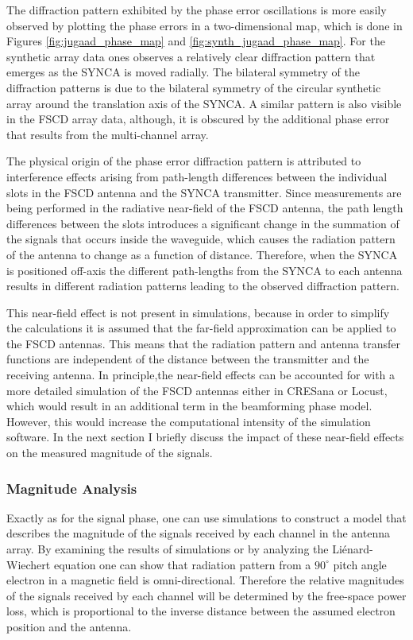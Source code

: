 The diffraction pattern exhibited by the phase error oscillations is more easily observed by plotting the phase errors in a two-dimensional map, which is done in Figures \ref{fig:jugaad_phase_map} and \ref{fig:synth_jugaad_phase_map}. For the synthetic array data ones observes a relatively clear diffraction pattern that emerges as the SYNCA is moved radially. The bilateral symmetry of the diffraction patterns is due to the bilateral symmetry of the circular synthetic array around the translation axis of the SYNCA. A similar pattern is also visible in the FSCD array data, although, it is obscured by the additional phase error that results from the multi-channel array.

The physical origin of the phase error diffraction pattern is attributed to interference effects arising from path-length differences between the individual slots in the FSCD antenna and the SYNCA transmitter. Since measurements are being performed in the radiative near-field of the FSCD antenna, the path length differences between the slots introduces a significant change in the summation of the signals that occurs inside the waveguide, which causes the radiation pattern of the antenna to change as a function of distance. Therefore, when the SYNCA is positioned off-axis the different path-lengths from the SYNCA to each antenna results in different radiation patterns leading to the observed diffraction pattern. 

This near-field effect is not present in simulations, because in order to simplify the calculations it is assumed that the far-field approximation can be applied to the FSCD antennas. This means that the radiation pattern and antenna transfer functions are independent of the distance between the transmitter and the receiving antenna. In principle,the near-field effects can be accounted for with a more detailed simulation of the FSCD antennas either in CRESana or Locust, which would result in an additional term in the beamforming phase model. However, this would increase the computational intensity of the simulation software. In the next section I briefly discuss the impact of these near-field effects on the measured magnitude of the signals.

\subsubsection{Magnitude Analysis}

Exactly as for the signal phase, one can use simulations to construct a model that describes the magnitude of the signals received by each channel in the antenna array. By examining the results of simulations or by analyzing the Li\'{e}nard-Wiechert equation one can show that radiation pattern from a $90^\circ$ pitch angle electron in a magnetic field is omni-directional. Therefore the relative magnitudes of the signals received by each channel will be determined by the free-space power loss, which is proportional to the inverse distance between the assumed electron position and the antenna. 

